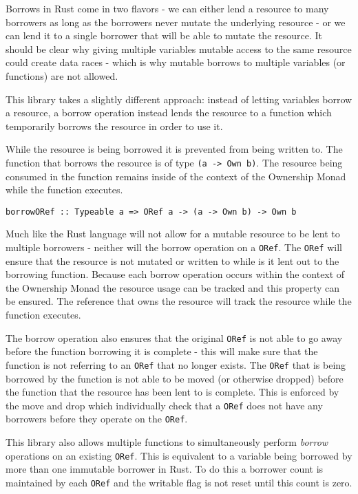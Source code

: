 \documentclass[onehalf,11pt]{beavtex}
\begin{document}
Borrows in Rust come in two flavors - we can either lend a resource to many
borrowers as long as the borrowers never mutate the underlying resource - or we
can lend it to a single borrower that will be able to mutate the
resource.\cite{rust_book_borrowing}
It should be clear why giving multiple variables mutable access to
the same resource could create data races - which is why mutable borrows to
multiple variables (or functions) are not allowed.

This library takes a slightly different approach: instead of letting variables
borrow a resource, a borrow operation instead lends the resource to a function
which temporarily borrows the resource in order to use it.

While the resource is being borrowed it is prevented from being written to.
The function that borrows the resource is of type \texttt{(a -> Own b)}. The
resource being consumed in the function remains inside of the context of the
Ownership Monad while the function executes.

\begin{verbatim}
borrowORef :: Typeable a => ORef a -> (a -> Own b) -> Own b
\end{verbatim}

Much like the Rust language will not allow for a mutable resource to be lent to
multiple borrowers - neither will the borrow operation on a \texttt{ORef}.
The \texttt{ORef} will ensure that the resource is not mutated or written to while is it
lent out to the borrowing function. 
Because each borrow operation occurs within the context of the Ownership Monad
the resource usage can be tracked and this property can be ensured. The
reference that owns the resource will track the resource while the function
executes.

The borrow operation also ensures that the original \texttt{ORef} is not able to go away
before the function borrowing it is complete - this will make sure that the
function is not referring to an \texttt{ORef} that no longer exists.  The \texttt{ORef} that is
being borrowed by the function is not able to be moved (or otherwise dropped)
before the function that the resource has been lent to is complete. This is
enforced by the move and drop which individually check that
a \texttt{ORef} does not have any borrowers before they operate on the \texttt{ORef}.

This library also allows multiple functions to simultaneously perform
\textit{borrow} operations on an existing \texttt{ORef}. This is equivalent to a variable
being borrowed by more than one immutable borrower in Rust. To do this a
borrower count is maintained by each \texttt{ORef} and the writable flag is not
reset until this count is zero.
\end{document}
